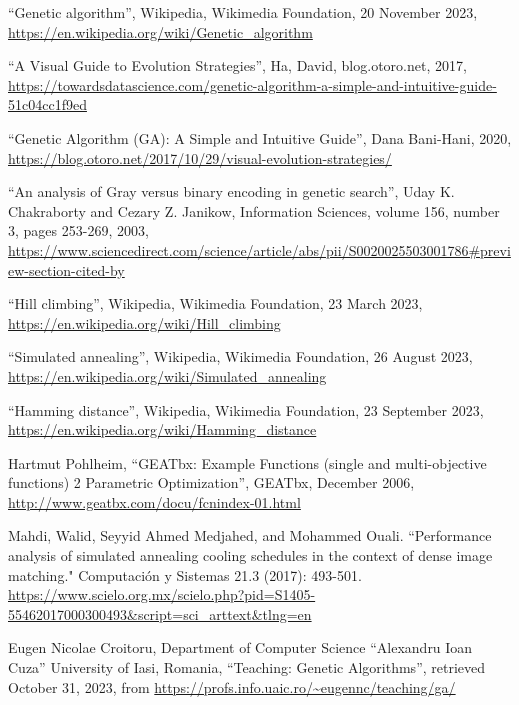 \documentclass{article}
\begin{document}
\begin{thebibliography}{9}

``Genetic algorithm'', Wikipedia, Wikimedia Foundation, 20 November 2023, \url{https://en.wikipedia.org/wiki/Genetic_algorithm}

``A Visual Guide to Evolution Strategies'', Ha, David, blog.otoro.net, 2017, \url{https://towardsdatascience.com/genetic-algorithm-a-simple-and-intuitive-guide-51c04cc1f9ed}

``Genetic Algorithm (GA): A Simple and Intuitive Guide'', Dana Bani-Hani, 2020, \url{https://blog.otoro.net/2017/10/29/visual-evolution-strategies/}

``An analysis of Gray versus binary encoding in genetic search'', Uday K. Chakraborty and Cezary Z. Janikow, Information Sciences, volume 156, number 3, pages 253-269, 2003, \url{https://www.sciencedirect.com/science/article/abs/pii/S0020025503001786#preview-section-cited-by}

``Hill climbing'', Wikipedia, Wikimedia Foundation, 23 March 2023, \url{https://en.wikipedia.org/wiki/Hill\_climbing}

``Simulated annealing'', Wikipedia, Wikimedia Foundation, 26 August 2023, \url{https://en.wikipedia.org/wiki/Simulated\_annealing}

``Hamming distance'', Wikipedia, Wikimedia Foundation, 23 September 2023, \url{https://en.wikipedia.org/wiki/Hamming\_distance}

Hartmut Pohlheim, ``GEATbx: Example Functions (single and multi-objective functions) 2 Parametric Optimization'', GEATbx, December 2006, \url{http://www.geatbx.com/docu/fcnindex-01.html}

Mahdi, Walid, Seyyid Ahmed Medjahed, and Mohammed Ouali. ``Performance analysis of simulated annealing cooling schedules in the context of dense image matching." Computación y Sistemas 21.3 (2017): 493-501. \url{https://www.scielo.org.mx/scielo.php?pid=S1405-55462017000300493&script=sci_arttext&tlng=en}

Eugen Nicolae Croitoru, Department of Computer Science ``Alexandru Ioan Cuza'' University of Iasi, Romania, ``Teaching: Genetic Algorithms'', retrieved October 31, 2023, from \url{https://profs.info.uaic.ro/~eugennc/teaching/ga/}

\end{thebibliography}
\end{document}
